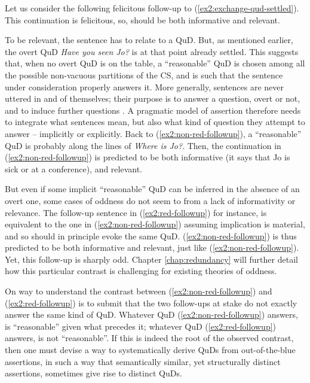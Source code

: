 Let us consider the following felicitous follow-up to (\ref{ex2:exchange-qud-settled}). This continuation is felicitous, so, should be both informative and relevant.

\begin{exe}
	\label{ex2:non-red-followup}
\end{exe}

To be relevant, the sentence has to relate to a QuD. But, as mentioned earlier, the overt QuD \textit{Have you seen Jo?} is at that point already settled. This suggests that, when no overt QuD is on the table, a ``reasonable'' QuD is chosen among all the possible non-vacuous partitions of the CS, and is such that the sentence under consideration properly answers it. More generally, sentences are never uttered in and of themselves; their purpose is to answer a question, overt or not, and to induce further questions \cite{Roberts1996}. A pragmatic model of assertion therefore needs to integrate what sentences mean, but also what kind of question they attempt to answer -- implicitly or explicitly. Back to (\ref{ex2:non-red-followup}), a ``reasonable'' QuD is probably along the lines of \textit{Where is Jo?}. Then, the continuation in (\ref{ex2:non-red-followup}) is predicted to be both informative (it says that Jo is sick or at a conference), and relevant.


But even if some implicit ``reasonable'' QuD can be inferred in the absence of an overt one, some cases of oddness do not seem to from a lack of informativity or relevance. The follow-up sentence in (\ref{ex2:red-followup}) for instance, is equivalent to the one in (\ref{ex2:non-red-followup}) assuming implication is material, and so should in principle evoke the same QuD. (\ref{ex2:non-red-followup}) is thus predicted to be both informative and relevant, just like (\ref{ex2:non-red-followup}). Yet, this follow-up is sharply odd. Chapter \ref{chap:redundancy} will further detail how this particular contrast is challenging for existing theories of oddness.

\begin{exe}
	\label{ex2:red-followup}
\end{exe}

On way to understand the contrast between (\ref{ex2:non-red-followup}) and (\ref{ex2:red-followup}) is to submit that the two follow-ups at stake do not exactly answer the same kind of QuD. Whatever QuD (\ref{ex2:non-red-followup}) answers, is ``reasonable'' given what precedes it; whatever QuD (\ref{ex2:red-followup}) answers, is not ``reasonable''. If this is indeed the root of the observed contrast, then one must devise a way to systematically derive QuDs from out-of-the-blue assertions, in such a way that semantically similar, yet structurally distinct assertions, sometimes give rise to distinct QuDs.



